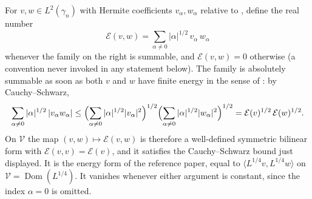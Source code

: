 \begin{definition}
For $v, w \in L^2(\gamma_n)$ with Hermite coefficients $v_\alpha, w_\alpha$
relative to , define the real number
\[
  \mathcal{E}(v,w) = \sum_{\alpha \neq 0} |\alpha|^{1/2}\, v_\alpha\, w_\alpha
\]
whenever the family on the right is summable, and $\mathcal{E}(v,w) = 0$
otherwise (a convention never invoked in any statement below).  The family is
absolutely summable as soon as both $v$ and $w$ have finite energy in the sense of
: by Cauchy--Schwarz,
\[
  \sum_{\alpha \neq 0} |\alpha|^{1/2}\,|v_\alpha w_\alpha|
    \leq \Bigl(\sum_{\alpha\neq0}|\alpha|^{1/2}|v_\alpha|^2\Bigr)^{1/2}
         \Bigl(\sum_{\alpha\neq0}|\alpha|^{1/2}|w_\alpha|^2\Bigr)^{1/2}
    = \mathcal{E}(v)^{1/2}\,\mathcal{E}(w)^{1/2}.
\]
On $\mathcal{V}$ the map $(v,w) \mapsto \mathcal{E}(v,w)$ is therefore a
well-defined symmetric bilinear form with $\mathcal{E}(v,v) = \mathcal{E}(v)$,
and it satisfies the Cauchy--Schwarz bound just displayed.  It is the energy form
of the reference paper, equal to $\langle L^{1/4}v, L^{1/4}w\rangle$ on
$\mathcal{V} = \operatorname{Dom}(L^{1/4})$.  It vanishes whenever either argument
is constant, since the index $\alpha = 0$ is omitted.
\end{definition}
